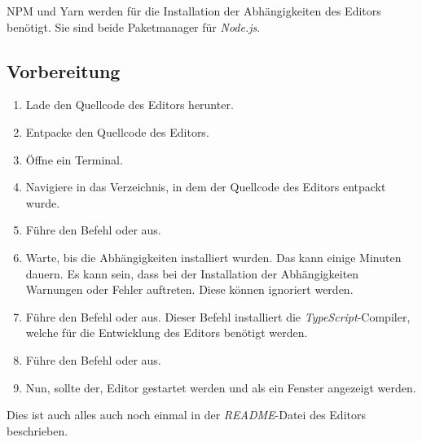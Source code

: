 NPM und Yarn werden für die Installation der Abhängigkeiten des Editors benötigt.
Sie sind beide Paketmanager für \emph{Node.js}.

\subsection{Vorbereitung}\label{subsec:vorbereitung}

\begin{enumerate}
	\item Lade den Quellcode des Editors herunter.
	\item Entpacke den Quellcode des Editors.
	\item Öffne ein Terminal.
	\item Navigiere in das Verzeichnis, in dem der Quellcode des Editors entpackt wurde.
	\item Führe den Befehl  oder  aus.
	\item Warte, bis die Abhängigkeiten installiert wurden.
	Das kann einige Minuten dauern.
	Es kann sein, dass bei der Installation der Abhängigkeiten Warnungen oder Fehler auftreten.
	Diese können ignoriert werden.
	\item Führe den Befehl  oder  aus.
	Dieser Befehl installiert die \emph{TypeScript}-Compiler, welche für die Entwicklung des Editors benötigt werden.
	\item Führe den Befehl  oder  aus.
	\item Nun, sollte der, Editor gestartet werden und als ein Fenster angezeigt werden.
\end{enumerate}

Dies ist auch alles auch noch einmal in der \emph{README}-Datei des Editors beschrieben.
